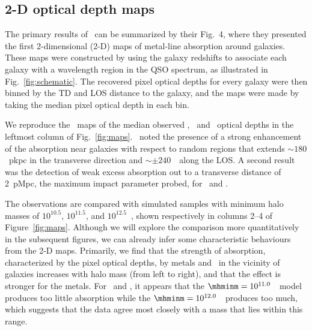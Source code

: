 \documentclass[useAMS,usenatbib,letterpaper]{mn2e}
\def\obspaper{\citetalias{turner14}}
\begin{document}
\subsection{2-D optical depth maps}
\label{sec:maps}

The primary results of \obspaper\ can be summarized by their
Fig.~4, where they presented the first 2-dimensional (2-D)  maps of metal-line
absorption around galaxies. These maps
 were constructed by  using the galaxy redshifts to associate each galaxy with a 
wavelength region in the QSO spectrum, as illustrated in Fig.~\ref{fig:schematic}.
The recovered pixel
optical depths for every galaxy were then binned by the TD
and LOS distance to the galaxy, and the maps were made by taking the median
pixel optical depth in each bin. 

We reproduce the \obspaper\ maps of the median observed \hone, \cfour\ and \sifour\ optical depths in
the leftmost column of Fig.~\ref{fig:maps}. \obspaper\ noted
the presence of a strong enhancement of the absorption near galaxies with respect to random 
regions that extends $\sim180$~pkpc in the transverse direction and 
$\sim\pm240$~\kmps\ along the LOS.
A second result was the detection of weak excess absorption 
out to a transverse distance of 2~pMpc, the maximum 
impact parameter probed, for \hone\ and \cfour. 

The observations are compared with simulated samples with minimum
halo masses of $10^{10.5}$, $10^{11.5}$, and $10^{12.5}$~\msol, shown
respectively in columns 2--4 of Figure~\ref{fig:maps}.  
Although we will explore the comparison more quantitatively in the subsequent
figures, we can already infer some characteristic behaviours from the 2-D maps. 
Primarily, we find that the strength of absorption, characterized by the pixel optical depths, by metals and \hone\ in the vicinity
of galaxies increases with halo mass (from left to right), and that the effect is stronger for the metals.
For \cfour\ and \sifour, it appears that the $\mhminm=10^{11.0}$~\msol\
model produces too little absorption while the $\mhminm=10^{12.0}$~\msol\ produces too much, 
which suggests that the data agree most closely with a mass that lies within this range. 
\end{document}
